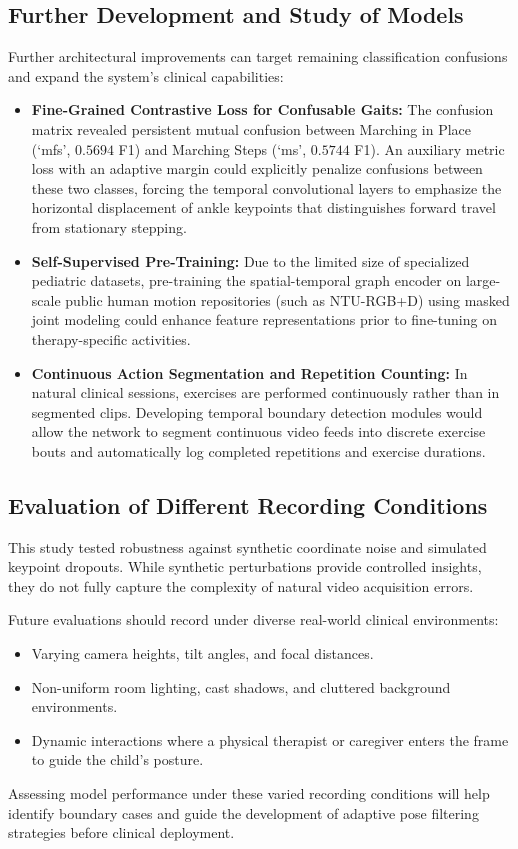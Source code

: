 \subsection{Further Development and Study of Models}

Further architectural improvements can target remaining classification confusions and expand the system’s clinical capabilities:
\begin{itemize}
    \item \textbf{Fine-Grained Contrastive Loss for Confusable Gaits:} The confusion matrix revealed persistent mutual confusion between Marching in Place (`mfs', $0.5694$ F1) and Marching Steps (`ms', $0.5744$ F1). An auxiliary metric loss with an adaptive margin could explicitly penalize confusions between these two classes, forcing the temporal convolutional layers to emphasize the horizontal displacement of ankle keypoints that distinguishes forward travel from stationary stepping.
    \item \textbf{Self-Supervised Pre-Training:} Due to the limited size of specialized pediatric datasets, pre-training the spatial-temporal graph encoder on large-scale public human motion repositories (such as NTU-RGB+D) using masked joint modeling could enhance feature representations prior to fine-tuning on therapy-specific activities.
    \item \textbf{Continuous Action Segmentation and Repetition Counting:} In natural clinical sessions, exercises are performed continuously rather than in segmented clips. Developing temporal boundary detection modules would allow the network to segment continuous video feeds into discrete exercise bouts and automatically log completed repetitions and exercise durations.
\end{itemize}

\subsection{Evaluation of Different Recording Conditions}

This study tested robustness against synthetic coordinate noise and simulated keypoint dropouts. While synthetic perturbations provide controlled insights, they do not fully capture the complexity of natural video acquisition errors.

Future evaluations should record under diverse real-world clinical environments:
\begin{itemize}
    \item Varying camera heights, tilt angles, and focal distances.
    \item Non-uniform room lighting, cast shadows, and cluttered background environments.
    \item Dynamic interactions where a physical therapist or caregiver enters the frame to guide the child's posture.
\end{itemize}
Assessing model performance under these varied recording conditions will help identify boundary cases and guide the development of adaptive pose filtering strategies before clinical deployment.

